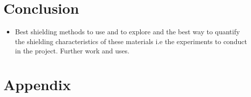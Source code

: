 \documentclass[a4paper,12pt]{article}
\begin{document}
\section{Conclusion}
\begin{itemize}
\item 
Best shielding methods to use and to explore and the best way to quantify the shielding characteristics of these materials i.e the experiments to conduct in the project. Further work and uses. 
\end{itemize}
	
	
	
	 	

\begin{thebibliography}{9}



\end{thebibliography}
\appendix 
\section{Appendix}
\end{document}

